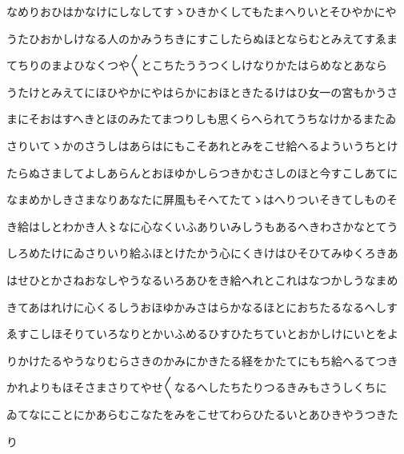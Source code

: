 \documentclass[a4paper,11pt,landscape]{ltjtarticle}
\begin{document}
\par\medskip
なめりおひはかなけにしなしてすゝひきかくしてもたまへりいとそひやかにや
\par\medskip
うたひおかしけなる人のかみうちきにすこしたらぬほとならむとみえてすゑま
\par\medskip
てちりのまよひなくつや〱とこちたううつくしけなりかたはらめなとあなら
\par\medskip
うたけとみえてにほひやかにやはらかにおほときたるけはひ女一の宮もかうさ
\par\medskip
まにそおはすへきとほのみたてまつりしも思くらへられてうちなけかるまたゐ
\par\medskip
さりいてゝかのさうしはあらはにもこそあれとみをこせ給へるよういうちとけ
\par\medskip
たらぬさましてよしあらんとおほゆかしらつきかむさしのほと今すこしあてに
\par\medskip
なまめかしきさまなりあなたに屏風もそへてたてゝはへりついそきてしものそ
\par\medskip
き給はしとわかき人〻なに心なくいふありいみしうもあるへきわさかなとてう
\par\medskip
しろめたけにゐさりいり給ふほとけたかう心にくきけはひそひてみゆくろきあ
\par\medskip
はせひとかさねおなしやうなるいろあひをき給へれとこれはなつかしうなまめ
\par\medskip
きてあはれけに心くるしうおほゆかみさはらかなるほとにおちたるなるへしす
\par\medskip
ゑすこしほそりていろなりとかいふめるひすひたちていとおかしけにいとをよ
\par\medskip
りかけたるやうなりむらさきのかみにかきたる経をかたてにもち給へるてつき
\par\medskip
かれよりもほそさまさりてやせ〱なるへしたちたりつるきみもさうしくちに
\par\medskip
ゐてなにことにかあらむこなたをみをこせてわらひたるいとあひきやうつきた
\par\medskip
り
\par\medskip
\end{document}
